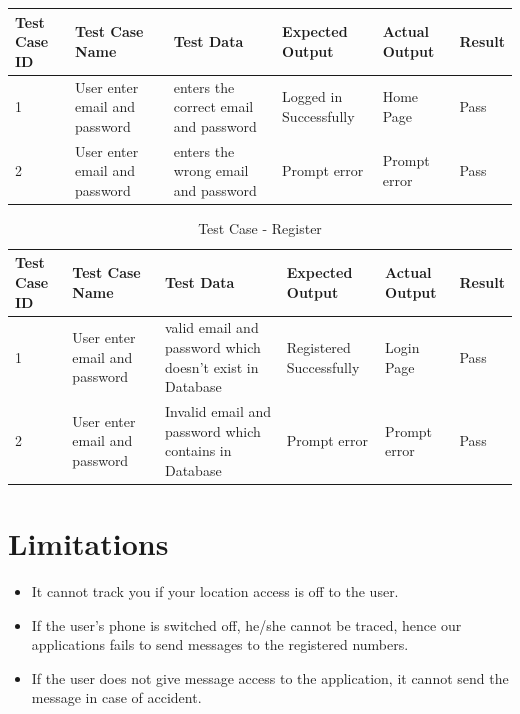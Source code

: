 \documentclass{article}
\begin{document}
\begin{flushleft}
\begin{center}
\begin{table}[!ht]
\begin{tabular}{ | m{1cm}| m{2cm}| m{2cm}| m{2cm}| m{2cm} | m{1cm} | }
            \hline
             Test Case ID & Test Case Name & Test Data & Expected Output & Actual Output & Result  \\ \hline
             1 & User enter email and password & enters the correct email and password & Logged in Successfully & Home Page & Pass  \\  \hline
             2 & User enter email and password & enters the wrong email and password & Prompt error & Prompt error & Pass  \\  \hline
            \end{tabular}
           \end{table}
           \end{center}
           
           \begin{center}
           \begin{table}[!ht]
           \renewcommand\thetable{5.2.2}
               \centering
               \caption{Test Case - Register}
               \label{"""""}
              \begin{tabular}{ | p{1cm}| p{2cm}| p{2cm}| p{2cm}| p{2cm} | p{1cm} | }
           
            \hline
             Test Case ID & Test Case Name & Test Data & Expected Output & Actual Output & Result  \\ \hline
             1 & User enter email and password & valid email and password which doesn't exist in Database & Registered Successfully & Login Page & Pass  \\  \hline
             2 & User enter email and password & Invalid email and password which contains in Database &  Prompt error & Prompt error & Pass  \\  \hline
            \end{tabular}
           \end{table}
           \end{center}
            
            \newpage
    
    \section{Limitations}
    \begin{itemize}
        \item It cannot track you if your location access is off to the user.
        \item If the user's phone is switched off,  he/she cannot be traced, hence our applications fails to send messages to the registered numbers.
        \item If the user does not give message access to the application, it cannot send the message in case of accident.
        

\end{itemize}
\end{flushleft}
\end{document}
